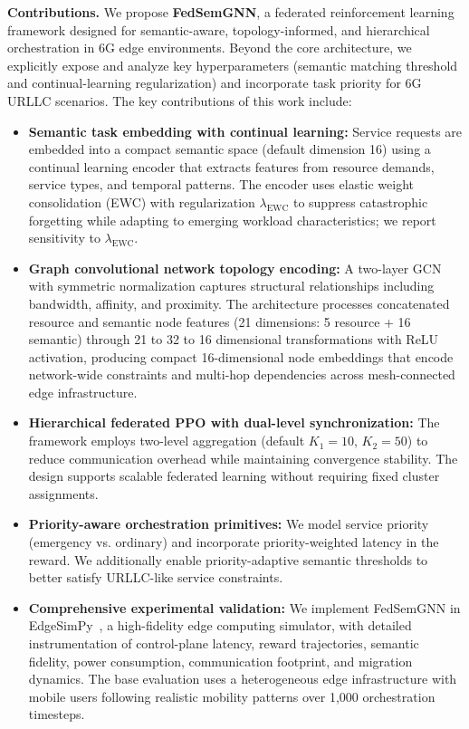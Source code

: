 \documentclass[conference]{IEEEtran}
\begin{document}
	\noindent\textbf{Contributions.} We propose \textbf{FedSemGNN}, a federated reinforcement learning framework designed for semantic-aware, topology-informed, and hierarchical orchestration in 6G edge environments. Beyond the core architecture, we explicitly expose and analyze key hyperparameters (semantic matching threshold and continual-learning regularization) and incorporate task priority for 6G URLLC scenarios. The key contributions of this work include:
	
	\begin{itemize}
		\item \textbf{Semantic task embedding with continual learning:} Service requests are embedded into a compact semantic space (default dimension 16) using a continual learning encoder that extracts features from resource demands, service types, and temporal patterns. The encoder uses elastic weight consolidation (EWC) with regularization $\lambda_{\mathrm{EWC}}$ to suppress catastrophic forgetting while adapting to emerging workload characteristics; we report sensitivity to $\lambda_{\mathrm{EWC}}$.
		
		\item \textbf{Graph convolutional network topology encoding:} A two-layer GCN with symmetric normalization captures structural relationships including bandwidth, affinity, and proximity. The architecture processes concatenated resource and semantic node features (21 dimensions: 5 resource + 16 semantic) through 21 to 32 to 16 dimensional transformations with ReLU activation, producing compact 16-dimensional node embeddings that encode network-wide constraints and multi-hop dependencies across mesh-connected edge infrastructure.
		
		\item \textbf{Hierarchical federated PPO with dual-level synchronization:} The framework employs two-level aggregation (default $K_1{=}10$, $K_2{=}50$) to reduce communication overhead while maintaining convergence stability. The design supports scalable federated learning without requiring fixed cluster assignments.
		
		\item \textbf{Priority-aware orchestration primitives:} We model service priority (emergency vs. ordinary) and incorporate priority-weighted latency in the reward. We additionally enable priority-adaptive semantic thresholds to better satisfy URLLC-like service constraints.
		
		\item \textbf{Comprehensive experimental validation:} We implement FedSemGNN in EdgeSimPy~\cite{souza2023edgesimpy}, a high-fidelity edge computing simulator, with detailed instrumentation of control-plane latency, reward trajectories, semantic fidelity, power consumption, communication footprint, and migration dynamics. The base evaluation uses a heterogeneous edge infrastructure with mobile users following realistic mobility patterns over 1,000 orchestration timesteps.
		

\end{itemize}
\end{document}

